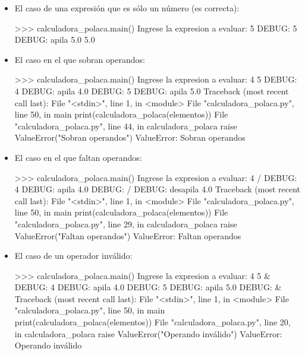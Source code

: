 \begin{itemize}
\item El caso de una expresión que es sólo un número (es correcta):

\begin{codigo-python-sn}
>>> calculadora_polaca.main()
Ingrese la expresion a evaluar: 5
DEBUG: 5
DEBUG: apila  5.0
5.0
\end{codigo-python-sn}

\item El caso en el que sobran operandos:

\begin{codigo-python-sn}
>>> calculadora_polaca.main()
Ingrese la expresion a evaluar: 4 5
DEBUG: 4
DEBUG: apila  4.0
DEBUG: 5
DEBUG: apila  5.0
Traceback (most recent call last):
  File "<stdin>", line 1, in <module>
  File "calculadora_polaca.py", line 50, in main
    print(calculadora_polaca(elementos))
  File "calculadora_polaca.py", line 44, in calculadora_polaca
    raise ValueError("Sobran operandos")
ValueError: Sobran operandos
\end{codigo-python-sn}

\item El caso en el que faltan operandos:

\begin{codigo-python-sn}
>>> calculadora_polaca.main()
Ingrese la expresion a evaluar: 4 /
DEBUG: 4
DEBUG: apila  4.0
DEBUG: /
DEBUG: desapila  4.0
Traceback (most recent call last):
  File "<stdin>", line 1, in <module>
  File "calculadora_polaca.py", line 50, in main
    print(calculadora_polaca(elementos))
  File "calculadora_polaca.py", line 29, in calculadora_polaca
    raise ValueError("Faltan operandos")
ValueError: Faltan operandos
\end{codigo-python-sn}

\item El caso de un operador inválido:

\begin{codigo-python-sn}
>>> calculadora_polaca.main()
Ingrese la expresion a evaluar: 4 5 &
DEBUG: 4
DEBUG: apila  4.0
DEBUG: 5
DEBUG: apila  5.0
DEBUG: &
Traceback (most recent call last):
  File "<stdin>", line 1, in <module>
  File "calculadora_polaca.py", line 50, in main
    print(calculadora_polaca(elementos))
  File "calculadora_polaca.py", line 20, in calculadora_polaca
    raise ValueError("Operando inválido")
ValueError: Operando inválido
\end{codigo-python-sn}


\end{itemize}
